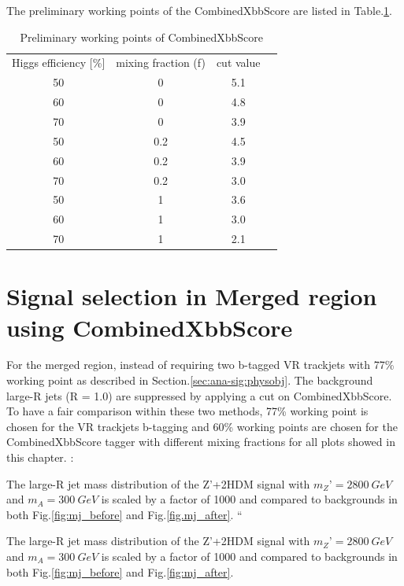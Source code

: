 The preliminary working points of the CombinedXbbScore are listed in Table.\ref{tab:combxbb}.

\begin{table}
    \footnotesize{
        \begin{center}
            \begin{tabular}{ c |c |c |c}
                \hline
                \hline

                Higgs efficiency [\%]	& mixing fraction (f)	& cut value \\
                50	&0	&5.1	 \\
                60	&0	&4.8	 \\
                70	&0	&3.9	 \\
                50	&0.2	&4.5	 \\
                60	&0.2	&3.9	 \\
                70	&0.2	&3.0	 \\
                50	&1	&3.6	 \\
                60	&1	&3.0	 \\
                70	&1	&2.1	\\
                \hline
                \hline
            \end{tabular}
        \end{center}
    }
    \caption{Preliminary working points of CombinedXbbScore}
    \label{tab:combxbb}
\end{table}


\section{Signal selection in Merged region using CombinedXbbScore}
\par For the merged region, instead of requiring two b-tagged VR trackjets  with 77\% working point as described in Section.\ref{sec:ana-sig:physobj}. The background large-R jets (R = 1.0) are suppressed by applying a cut on CombinedXbbScore. To have a fair comparison within these two methods, 77\% working point is chosen for the VR trackjets b-tagging and 60\% working points are chosen for the CombinedXbbScore tagger with different mixing fractions for all plots showed in this chapter.					:\par The large-R jet mass distribution of the Z’+2HDM signal with $m_Z’ = 2800~GeV$ and $m_A = 300~GeV$ is scaled by a factor of 1000 and compared to backgrounds in both Fig.\ref{fig:mj_before} and Fig.\ref{fig.mj_after}. 	
``\par The large-R jet mass distribution of the Z’+2HDM signal with $m_Z’ = 2800~GeV$ and $m_A = 300~GeV$ is scaled by a factor of 1000 and compared to backgrounds in both Fig.\ref{fig:mj_before} and Fig.\ref{fig:mj_after}. 	

